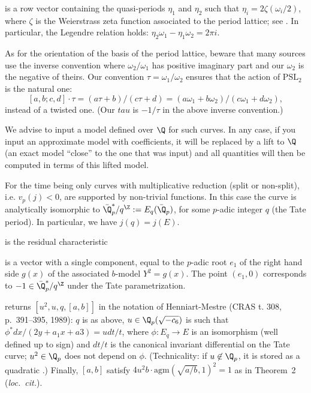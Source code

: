 \item {} is a row vector containing the quasi-periods $\eta_1$ and
$\eta_2$ such that $\eta_i = 2\zeta(\omega_i/2)$, where $\zeta$ is the
Weierstrass zeta function associated to the period lattice; see
. In particular, the Legendre relation holds: $\eta_2\omega_1 -
\eta_1\omega_2 = 2\pi i$.

 As for the orientation of the basis of the period lattice,
beware that many sources use the inverse convention where $\omega_2/\omega_1$
has positive imaginary part and our $\omega_2$ is the negative of theirs. Our
convention $\tau = \omega_1/\omega_2$  ensures that the action of $\text{PSL}_2$ is the natural
one:
$$[a,b;c,d]\cdot\tau = (a\tau+b)/(c\tau+d)
  = (a \omega_1 + b\omega_2)/(c\omega_1 + d\omega_2),$$
instead of a twisted one. (Our $tau$ is $-1/\tau$ in the above inverse
convention.)


We advise to input a model defined over $\Q$ for such curves. In any case,
if you input an approximate model with  coefficients, it will be
replaced by a lift to $\Q$ (an exact model ``close'' to the one that was
input) and all quantities will then be computed in terms of this lifted
model.

For the time being only curves with multiplicative reduction (split or
non-split), i.e. $v_p(j) < 0$, are supported by non-trivial functions. In
this case the curve is analytically isomorphic to $\bar{\Q}_p^*/q^\Z :=
E_q(\bar{\Q}_p)$, for some $p$-adic integer $q$ (the Tate period). In
particular, we have $j(q) = j(E)$.

\item {} is the residual characteristic

\item {} is a vector with a single component, equal to the $p$-adic
root $e_1$ of the right hand side $g(x)$ of the associated $b$-model $Y^2
= g(x)$. The point $(e_1,0)$ corresponds to $-1 \in \bar{\Q}_p^*/q^\Z$
under the Tate parametrization.

\item {} returns $[u^2,u,q,[a,b]]$ in the notation of Henniart-Mestre
(CRAS t. 308, p.~391--395, 1989): $q$ is as above, $u\in \Q_p(\sqrt{-c_6})$
is such that $\phi^* dx/(2y + a_1x+a3) = u dt/t$, where $\phi: E_q\to E$
is an isomorphism (well defined up to sign) and $dt/t$ is the canonical
invariant differential on the Tate curve; $u^2\in\Q_p$ does not depend on
$\phi$. (Technicality: if $u\not\in\Q_p$, it is stored as a quadratic
.)
Finally, $[a,b]$ satisfy $4u^2 b \cdot \text{agm}(\sqrt{a/b},1)^2 = 1$
as in Theorem~2 (\emph{loc.~cit.}).

